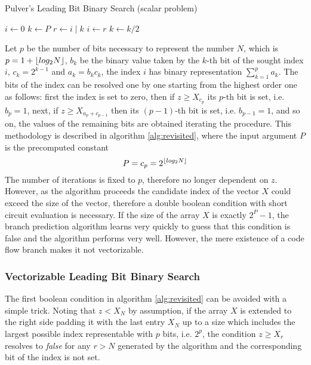 \documentclass[preprint,1p,times]{elsarticle}
\begin{document}
\begin{algorithm}[ht]
	\caption{Pulver's Leading Bit Binary Search (scalar problem)}
	\label{alg:revisited}
	\begin{algorithmic}
		 
		\State $i \leftarrow 0$
		\State $k \leftarrow P$
		\Repeat
		\State $r \leftarrow i\;|\;k$ 
		 
		\State $i \leftarrow r$
		\EndIf
		\State $k \leftarrow k / 2$ 
		\EndFunction
	\end{algorithmic}
\end{algorithm}

Let $p$ be the number of bits necessary to represent the number $N$, which is $p=1+\left \lfloor  log_2 N  \right \rfloor$,
    $b_k$ be the binary value taken by the $k$-th bit of the sought index $i$,
    $c_k = 2^{k-1}$
    and $a_k = b_kc_k$,
the index $i$ has binary representation $\sum_{k=1}^{p}a_k$.
The bits of the index can be resolved one by one starting from the highest order one as follows:
first the index is set to zero, then if $z \geq X_{c_p}$ its $p$-th bit is set, i.e. $b_p=1$,
next, if $z \geq X_{a_p+c_{p-1}}$ then its $(p-1)$-th bit is set, i.e. $b_{p-1}=1$, 
and so on, the values of the remaining bits are obtained iterating the procedure.
This methodology is described in algorithm \ref{alg:revisited}, where the input argument $P$ is the precomputed constant $$P=c_p=2^{\left \lfloor  log_2 N  \right \rfloor}$$
The number of iterations is fixed to $p$, therefore no longer dependent on $z$. However,
as the algorithm proceeds the candidate index of the vector $X$ could exceed the
size of the vector, therefore a double boolean condition with short circuit evaluation is necessary. If the size of the array $X$ is exactly $2^P-1$, the branch prediction algorithm learns very quickly to guess that this condition is false and the algorithm performs very well. However, the mere existence of a code flow branch makes it not vectorizable.

\subsubsection{Vectorizable Leading Bit Binary Search}
\label{sec:leadbit}
The first boolean condition in algorithm \ref{alg:revisited} can be avoided with a simple trick.
Noting that $z<X_N$ by assumption, if the array $X$ is extended to the right side padding 
it with the last entry $X_N$ up to a size which includes the largest possible index representable with $p$ bits, i.e. $2^p$, the condition $z \geq X_{r}$ resolves to \textit{false} for any $r>N$ generated by the algorithm and the corresponding bit of the index is not set.
\end{document}
